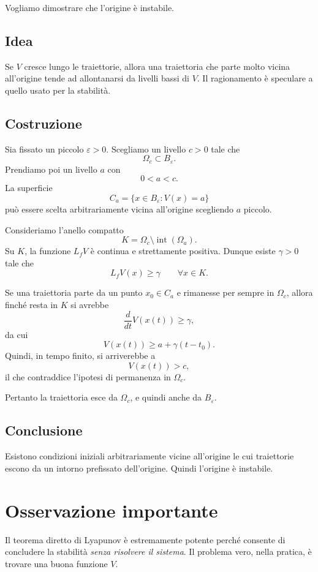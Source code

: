 Vogliamo dimostrare che l'origine è instabile.

\subsection*{Idea}
Se \(V\) cresce lungo le traiettorie, allora una traiettoria che parte molto vicina all'origine tende ad allontanarsi da livelli bassi di \(V\).  
Il ragionamento è speculare a quello usato per la stabilità.

\subsection*{Costruzione}
Sia fissato un piccolo \(\varepsilon>0\).  
Scegliamo un livello \(c>0\) tale che
\[
\Omega_c \subset B_\varepsilon.
\]
Prendiamo poi un livello \(a\) con
\[
0<a<c.
\]
La superficie
\[
C_a=\{x\in B_\varepsilon:V(x)=a\}
\]
può essere scelta arbitrariamente vicina all'origine scegliendo \(a\) piccolo.

Consideriamo l'anello compatto
\[
K=\Omega_c \setminus \operatorname{int}(\Omega_a).
\]
Su \(K\), la funzione \(L_fV\) è continua e strettamente positiva. Dunque esiste \(\gamma>0\) tale che
\[
L_fV(x)\ge \gamma
\qquad \forall x\in K.
\]

Se una traiettoria parte da un punto \(x_0\in C_a\) e rimanesse per sempre in \(\Omega_c\), allora finché resta in \(K\) si avrebbe
\[
\frac{d}{dt}V(x(t))\ge \gamma,
\]
da cui
\[
V(x(t))\ge a+\gamma(t-t_0).
\]
Quindi, in tempo finito, si arriverebbe a
\[
V(x(t))>c,
\]
il che contraddice l'ipotesi di permanenza in \(\Omega_c\).

Pertanto la traiettoria esce da \(\Omega_c\), e quindi anche da \(B_\varepsilon\).

\subsection*{Conclusione}
Esistono condizioni iniziali arbitrariamente vicine all'origine le cui traiettorie escono da un intorno prefissato dell'origine.  
Quindi l'origine è instabile.

\section{Osservazione importante}

Il teorema diretto di Lyapunov è estremamente potente perché consente di concludere la stabilità \emph{senza risolvere il sistema}.  
Il problema vero, nella pratica, è trovare una buona funzione \(V\).

